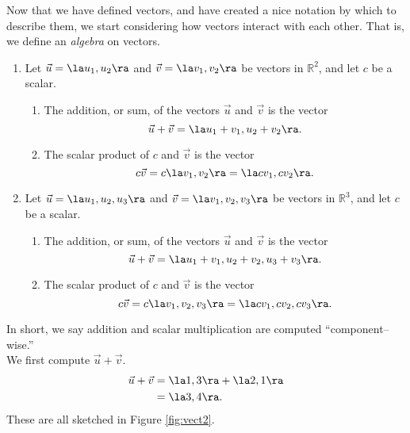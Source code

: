 Now that we have defined vectors, and have created a nice notation by which to describe them, we start considering how vectors interact with each other. That is, we define an \textit{algebra} on vectors. 

{\begin{enumerate}
	\item Let $\vec u = \la u_1,u_2\ra$ and $\vec v = \la v_1,v_2\ra$ be vectors in $\mathbb{R}^2$, and let $c$ be a scalar. 
				\begin{enumerate}
					\item The addition, or sum, of the vectors $\vec u$ and $\vec v$ is the vector
					\[
					\vec u+\vec v = \la u_1+v_1, u_2+v_2\ra.
					\]
					\item	The scalar product of $c$ and $\vec v$ is the vector 
					\[
					c\vec v = c\la v_1,v_2\ra = \la cv_1,cv_2\ra.
					\]
				\end{enumerate}
	\item Let $\vec u = \la u_1,u_2,u_3\ra$ and $\vec v = \la v_1,v_2,v_3\ra$ be vectors in $\mathbb{R}^3$, and let $c$ be a scalar. 
				\begin{enumerate}
					\item The addition, or sum, of the vectors $\vec u$ and $\vec v$ is the vector
					\[
					\vec u+\vec v = \la u_1+v_1, u_2+v_2, u_3+v_3\ra.
					\]
					\item	The scalar product of $c$ and $\vec v$ is the vector 
					\[
					c\vec v = c\la v_1,v_2,v_3\ra = \la cv_1,cv_2,cv_3\ra.
					\]
				\end{enumerate}
\end{enumerate}
}

In short, we say addition and scalar multiplication are computed ``component--wise.''\\

	{We first compute $\vec u +\vec v$. 
	\begin{align*}
	\vec u+\vec v &= \la 1,3\ra + \la 2,1\ra\\
								&= \la 3,4\ra.
	\end{align*}
	These are all sketched in Figure \ref{fig:vect2}.
}\\
	
